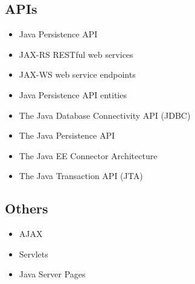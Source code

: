 \subsection{APIs}
\begin{itemize}
	\item Java Persistence API
\end{itemize}

\begin{itemize}
	\item JAX-RS RESTful web services
\end{itemize}

\begin{itemize}
	\item JAX-WS web service endpoints
\end{itemize}

\begin{itemize}
	\item Java Persistence API entities
\end{itemize}

\begin{itemize}
	\item The Java Database Connectivity API (JDBC)
\end{itemize}

\begin{itemize}
	\item The Java Persistence API
\end{itemize}

\begin{itemize}
	\item The Java EE Connector Architecture
\end{itemize}

\begin{itemize}
	\item The Java Transaction API (JTA)
\end{itemize}


\subsection{Others}
\begin{itemize}
	\item AJAX
\end{itemize}

\begin{itemize}
	\item Servlets
\end{itemize}

\begin{itemize}
	\item Java Server Pages
\end{itemize}


